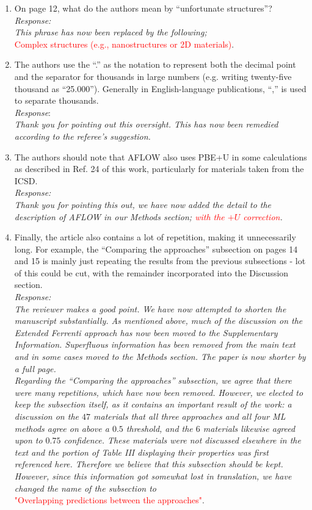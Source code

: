 \documentclass[11pt, a4paper]{letter} %
\newcommand{\mrk}[1]{\textcolor{red}{#1}}
\begin{document}
\begin{enumerate}
    \item On page 12, what do the authors mean by “unfortunate structures”? \\ 
    \textit{Response:} \\ 
    \textit{This phrase has now been replaced by the following;} \\ 
    \mrk{Complex structures (e.g., nanostructures or 2D materials)}.  
    \item The authors use the “.” as the notation to represent both the decimal point and the separator for thousands in large numbers (e.g. writing twenty-five thousand as “25.000”). Generally in English-language publications, “,” is used to separate thousands. \\ 
    \textit{Response}: \\
    \textit{Thank you for pointing out this oversight. This has now been remedied according to the referee's suggestion. } 
    \item The authors should note that AFLOW also uses PBE+U in some calculations as described in Ref. 24 of this work, particularly for materials taken from the ICSD. \\
    \textit{Response:} \\ 
    \textit{Thank you for pointing this out, we have now added the detail to the description of AFLOW in our Methods section; \mrk{with the $+U$ correction}.}
    \item Finally, the article also contains a lot of repetition, making it unnecessarily long. For example, the “Comparing the approaches” subsection on pages 14 and 15 is mainly just repeating the results from the previous subsections - lot of this could be cut, with the remainder incorporated into the Discussion section. \\ 
    \textit{Response:} \\ 
    \textit{The reviewer makes a good point. We have now attempted to shorten the manuscript substantially. As mentioned above, much of the discussion on the Extended Ferrenti approach has now been moved to the Supplementary Information. Superfluous information has been removed from the main text and in some cases moved to the Methods section. The paper is now shorter by a full page.} \\ 
    \textit{Regarding the “Comparing the approaches” subsection, we agree that there were many repetitions, which have now been removed. However, we elected to keep the subsection itself, as it  contains an important result of the work: a discussion on the $47$ materials that all three approaches and all four ML methods agree on above a $0.5$ threshold, and the $6$ materials likewise agreed upon to $0.75$ confidence. These materials were not discussed elsewhere in the text and the portion of Table III displaying their properties was first referenced here. Therefore we believe that this subsection should be kept. However, since this information got somewhat lost in translation, we have changed the name of the subsection to} \\ 
    \mrk{"Overlapping predictions between the approaches"}. 
\end{enumerate}
\end{document}

